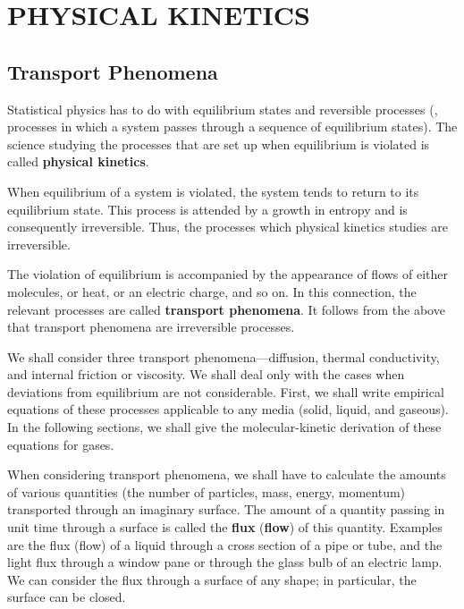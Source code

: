 
\chapter{PHYSICAL KINETICS}\label{chap:16}

\section{Transport Phenomena}\label{sec:16_1}

Statistical physics has to do with equilibrium states and reversible processes (\ie, processes in which a system passes through a sequence of equilibrium states). The science studying the processes that are set up when equilibrium is violated is called \textbf{physical kinetics}.

When equilibrium of a system is violated, the system tends to return to its equilibrium state. This process is attended by a growth in entropy and is consequently irreversible. Thus, the processes which physical kinetics studies are irreversible.

The violation of equilibrium is accompanied by the appearance of flows of either molecules, or heat, or an electric charge, and so on. In this connection, the relevant processes are called \textbf{transport phenomena}. It follows from the above that transport phenomena are irreversible processes.

We shall consider three transport phenomena---diffusion, thermal conductivity, and internal friction or viscosity. We shall deal only with the cases when deviations from equilibrium are not considerable. First, we shall write empirical equations of these processes applicable to any media (solid, liquid, and gaseous). In the following sections, we shall give the molecular-kinetic derivation of these equations for gases.

When considering transport phenomena, we shall have to calculate the amounts of various quantities (the number of particles, mass, energy, momentum) transported through an imaginary surface. The amount of a quantity passing in unit time through a surface is called the \textbf{flux} (\textbf{flow}) of this quantity. Examples are the flux (flow) of a liquid through a cross section of a pipe or tube, and the light flux through a window pane or through the glass bulb of an electric lamp. We can consider the flux through a surface of any shape; in particular, the surface can be closed.

